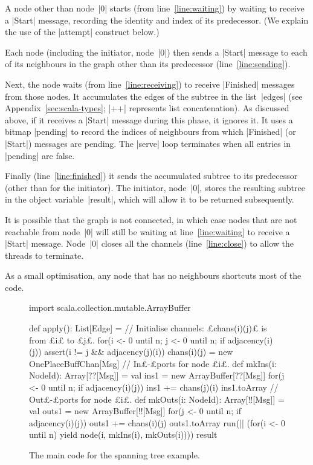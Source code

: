 
A node other than node~|0| starts (from line~\ref{line:waiting}) by waiting to
receive a |Start| message, recording the identity and index of its
predecessor.  (We explain the use of the |attempt| construct below.)

Each node (including the initiator, node~|0|) then sends a |Start| message to
each of its neighbours in the graph other than its predecessor
(line~\ref{line:sending}).

Next, the node waits (from line~\ref{line:receiving}) to receive |Finished|
messages from those nodes.  It accumulates the edges of the subtree in the
list~|edges| (see Appendix~\ref{sec:scala-types}; |++| represents list
concatenation).  As discussed above, if it receives a |Start| message during
this phase, it ignores it.  It uses a bitmap |pending| to record the indices
of neighbours from which |Finished| (or |Start|) messages are pending.  The
|serve| loop terminates when all entries in |pending| are false.

Finally (line~\ref{line:finished}) it sends the accumulated subtree to its
predecessor (other than for the initiator).  The initiator,  node~|0|, stores
the resulting subtree in the object variable~|result|, which will allow it to
be returned subsequently.

It is possible that the graph is not connected, in which case nodes that are
not reachable from node~|0| will still be waiting at line~\ref{line:waiting}
to receive a |Start| message.  Node~|0| closes all the channels
(line~\ref{line:close}) to allow the threads to terminate. 

As a small optimisation, any node that has no neighbours shortcuts most of the
code.


\begin{figure}[hbtp]
\begin{scala}
  import scala.collection.mutable.ArrayBuffer

  def apply(): List[Edge] = {
    // Initialise channels: £chans(i)(j)£ is from £i£ to £j£.
    for(i <- 0 until n; j <- 0 until n; if adjacency(i)(j)){
      assert(i != j && adjacency(j)(i))
      chans(i)(j) = new OnePlaceBuffChan[Msg]
    }
    // In£-£ports for node £i£.
    def mkIns(i: NodeId): Array[??[Msg]] = {
      val ins1 = new ArrayBuffer[??[Msg]]
      for(j <- 0 until n; if adjacency(i)(j)) ins1 += chans(j)(i)
      ins1.toArray
    }
    // Out£-£ports for node £i£.
    def mkOuts(i: NodeId): Array[!![Msg]] = {
      val outs1 = new ArrayBuffer[!![Msg]]
      for(j <- 0 until n; if adjacency(i)(j)) outs1 += chans(i)(j)
      outs1.toArray
    }
    run(|| (for(i <- 0 until n) yield node(i, mkIns(i), mkOuts(i))))
    result
  }
\end{scala}
\caption{The main code for the spanning tree example.}
\label{fig:spanning-tree-apply}
\end{figure}

